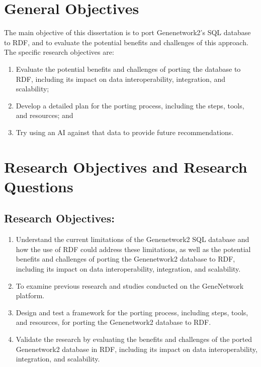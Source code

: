 \section{General Objectives}

The main objective of this dissertation is to port Genenetwork2's SQL database to RDF, and to evaluate the potential benefits and challenges of this approach.  The specific research objectives are:

\begin{enumerate}
\item Evaluate the potential benefits and challenges of porting the database to RDF, including its impact on data interoperability, integration, and scalability;
\item Develop a detailed plan for the porting process, including the steps, tools, and resources; and
\item Try using an AI against that data to provide future recommendations.
\end{enumerate}


\section{Research Objectives and Research Questions}

\subsection*{Research Objectives:}

\begin{enumerate}
\item Understand the current limitations of the Genenetwork2 SQL database and how the use of RDF could address these limitations, as well as the potential benefits and challenges of porting the Genenetwork2 database to RDF, including its impact on data interoperability, integration, and scalability.
  \item To examine previous research and studies conducted on the GeneNetwork platform.
\item Design and test a framework for the porting process, including steps, tools, and resources, for porting the Genenetwork2 database to RDF.
\item Validate the research by evaluating the benefits and challenges of the ported Genenetwork2 database in RDF, including its impact on data interoperability, integration, and scalability.
\end{enumerate}

